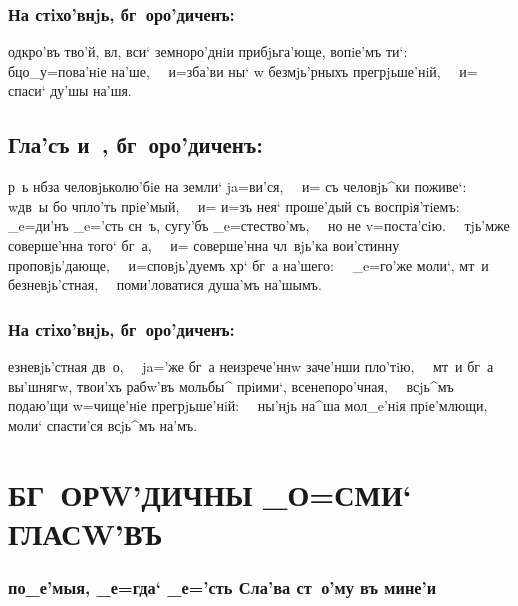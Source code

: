 \documentclass[14pt,twoside]{extreport}
\renewcommand{\*}{~~\raise3pt\hbox{\footnotesize*}}
\begin{document}
\subsubsection{На стiхо'внjь, бг~оро'диченъ:}

од\ъ кро'въ тво'й, вл, вси` земноро'днiи прибjьга'юще,
вопiе'мъ ти`:\* бц о_у=пова'нiе на'ше,\* и=зба'ви ны` w\т
безмjь'рныхъ прегрjьше'нiй,\* и= спаси` ду'шы на'шя.

\delimpict

\subsection[Гла'съ и~]{Гла'съ и~, бг~оро'диченъ:}

р~ь нб за человjьколю'бiе на земли` ja=ви'ся,\* и= съ
человjь^ки поживе`:\* w\т дв~ы бо ч пло'ть прiе'мый,\* и= и=зъ
нея` проше'дый съ вос\-прi\-я'\-тi\-емъ:\* _e=ди'нъ _e='сть сн~ъ, сугу'бъ
_e=стество'мъ,\* но не v=поста'сiю.\* тjь'мже соверше'нна того`
бг~а,\* и= соверше'нна чл~вjь'ка вои'стинну проповjь'дающе,\*
и=сповjь'дуемъ хр` бг~а на'шего:\* _e=го'же моли`, мт~и
безневjь'стная,\* поми'ловатися душа'мъ на'шымъ.

\subsubsection{На стiхо'внjь, бг~оро'диченъ:}

езневjь'стная дв~о,\* ja='же бг~а неизрече'ннw заче'нши
пло'тiю,\* мт~и бг~а вы'шнягw, твои'хъ рабw'въ мольбы^ прiими`,
всенепоро'чная,\* всjь^мъ подаю'щи w=чище'нiе прегрjьше'нiй:\* ны'нjь
на^ша мол_e'нiя прiе'млющи,\* моли` спасти'ся всjь^мъ на'мъ.

\baselineskip
\csendpictsmall
\clearpage


\hdrcrosspage
\section[Бг~орw'дичны _о=сми` гласw'въ]
{\MakeUppercase{Бг~орw'дичны _о=сми` гласw'въ}}

\subsubsection{по{_е'}мыя, _е=гда` _е='сть Сла'ва ст~о'му въ мине'и}
\end{document}
